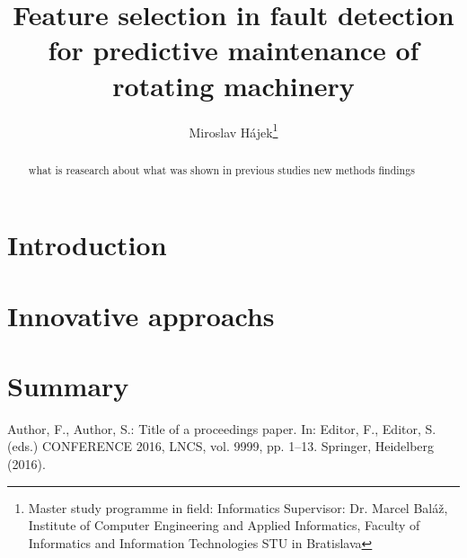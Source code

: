\documentclass{llncs}
\begin{document}
\title{Feature selection in fault detection for predictive maintenance of rotating machinery}
%
%
\author{
	Miroslav Hájek\thanks{Master study programme in field: Informatics Supervisor: Dr. Marcel Baláž, Institute of Computer Engineering and Applied Informatics, Faculty of Informatics and Information Technologies STU in Bratislava }
}


\maketitle 

\begin{abstract}

what is reasearch about
what was shown in previous studies
new methods
findings

\end{abstract}


\section{Introduction}


\section{Innovative approachs}



\section{Summary}


\begin{thebibliography}{1}

Author, F., Author, S.: Title of a proceedings paper. In: Editor,
F., Editor, S. (eds.) CONFERENCE 2016, LNCS, vol. 9999, pp. 1--13.
Springer, Heidelberg (2016). 

\end{thebibliography}
\end{document}
